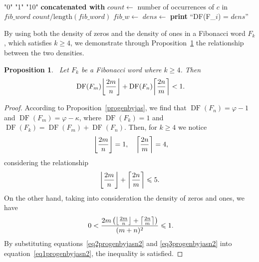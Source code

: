 \documentclass[11pt, a4paper]{article}
\newcommand{\DF}{\operatorname{DF}}
\DeclarePairedDelimiter\ceil{\lceil}{\rceil}
\DeclarePairedDelimiter\floor{\lfloor}{\rfloor}
\newtheorem{proposition}{Proposition}[section]
\theoremstyle{definition}
\begin{document}
\begin{algorithm}[H]
\caption{Calculate Density $\DF(F_m)$ for character $c$ in Fibonacci words}~\label{algorithm1}
\begin{algorithmic}[1]
        \State \Return "0"
        \State \Return "1"
        \State \Return "10"
    \Else
        \State \Return {} \textbf{concatenated with} 
    \EndIf
\EndProcedure
{}
    \State $count \gets$ number of occurrences of $c$ in $fib\_word$
    \State \Return $count / \text{length}(fib\_word)$
\EndFunction
{}
        \State $fib\_w \gets$ 
        \State $dens \gets$ 
        \State \textbf{print} ``DF(F\_$i$) = $dens$''
    \EndFor
\EndProcedure
\end{algorithmic}
\end{algorithm}

By using both the density of zeros and the density of ones in a Fibonacci word $F_k$, which satisfies $k \geqslant 4$, we demonstrate through Proposition~\ref{progenbyjasn2} the relationship between the two densities.

\begin{proposition}~\label{progenbyjasn2}
Let $F_k$ be a Fibonacci word where $k \geqslant 4$. Then
\begin{equation}~\label{eq1progenbyjasn2}
\DF(F_m) \floor*{\frac{2m}{n}} + \DF(F_n) \ceil*{\frac{2n}{m}} < 1.
\end{equation}
\end{proposition}

\begin{proof}
According to Proposition~\ref{progenbyjas}, we find that $\DF(F_n) = \varphi - 1$ and $\DF(F_m) = \varphi - \kappa$, where $\DF(F_k) = 1$ and $\DF(F_k) = \DF(F_m) + \DF(F_n)$. Then, for $k \geqslant 4$ we notice
\begin{equation}~\label{eq2progenbyjasn2}
\floor*{\frac{2m}{n}} = 1, \quad \ceil*{\frac{2n}{m}} = 4,
\end{equation}
considering the relationship 
\[
\floor*{\frac{2m}{n}} + \ceil*{\frac{2n}{m}} \leqslant 5.
\]
On the other hand, taking into consideration the density of zeros and ones, we have
\begin{equation}~\label{eq3progenbyjasn2}
0 < \frac{2m \left( \floor*{\frac{2m}{n}} + \ceil*{\frac{2n}{m}} \right)}{(m + n)^2} \leqslant 1.
\end{equation}
By substituting equations~\eqref{eq2progenbyjasn2} and \eqref{eq3progenbyjasn2} into equation~\eqref{eq1progenbyjasn2}, the inequality is satisfied.
\end{proof}
\end{document}
